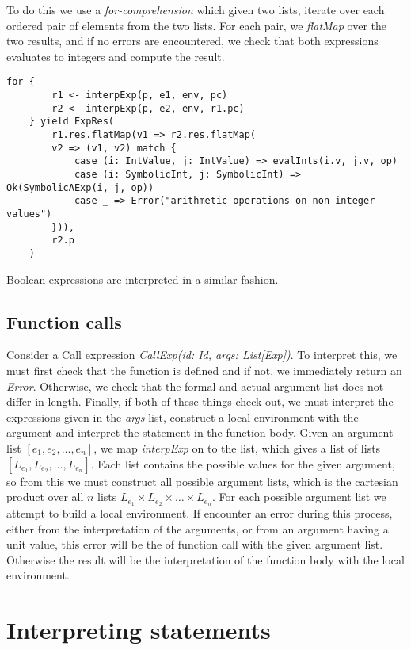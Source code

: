 To do this we use a \textsl{for-comprehension} which given two lists, iterate over each ordered pair of elements from the two lists.  For each pair, we \textsl{flatMap} over the two results, and if no errors are encountered, we check that both expressions evaluates to integers and compute the result.
\newpage
\begin{lstlisting}[style=simple]
	for {
		r1 <- interpExp(p, e1, env, pc)
		r2 <- interpExp(p, e2, env, r1.pc)
	} yield ExpRes(
		r1.res.flatMap(v1 => r2.res.flatMap(
		v2 => (v1, v2) match {
			case (i: IntValue, j: IntValue) => evalInts(i.v, j.v, op)
			case (i: SymbolicInt, j: SymbolicInt) => Ok(SymbolicAExp(i, j, op))
			case _ => Error("arithmetic operations on non integer values")
		})),
		r2.p
	)
\end{lstlisting}
Boolean expressions are interpreted in a similar fashion.

\subsection{Function calls}
Consider a Call expression \textsl{CallExp(id: Id, args: List[Exp])}.
To interpret this, we must first check that the function is defined and if not, we immediately return an \textsl{Error}. Otherwise, we check that the formal and actual argument list does not differ in length. Finally, if both of these things check out, we must interpret the expressions given in the \textsl{args} list, construct a local environment with the argument and interpret the statement in the function body. 
Given an argument list $[e_1, e_2, \ldots, e_n]$, we map \textsl{interpExp} on to the list, which gives a list of lists $[L_{e_1}, L_{e_2}, \ldots, L_{e_n}]$. Each list contains the possible values for the given argument, so from this we must construct all possible argument lists, which is the cartesian product over all $n$ lists $L_{e_1} \times L_{e_2} \times \ldots \times L_{e_n}$. For each possible argument list we attempt to build a local environment. If encounter an error during this process, either from the interpretation of the arguments, or from an argument having a unit value, this error will be the of function call with the given argument list. Otherwise the result will be the interpretation of the function body with the local environment. 

\section{Interpreting statements}